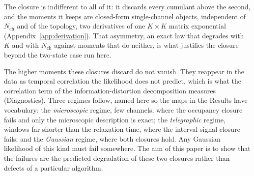 The closure is indifferent to all of it: it discards every cumulant above the second, and the
moments it keeps are closed-form single-channel objects, independent of $N_{\mathrm{ch}}$ and of
the topology, two derivatives of one $K\times K$ matrix exponential
(Appendix~\ref{app:derivation}). That asymmetry, an exact law that degrades with $K$ and with
$N_{\mathrm{ch}}$ against moments that do neither, is what justifies the closure beyond the
two-state case run here.

The higher moments these closures discard do not vanish. They reappear in the data as temporal
correlation the likelihood does not predict, which is what the correlation term of the
information-distortion decomposition measures (Diagnostics). Three regimes follow, named here so
the maps in the Results have vocabulary: the \emph{microscopic} regime, few channels, where the
occupancy closure fails and only the microscopic description is exact; the \emph{telegraphic}
regime, windows far shorter than the relaxation time, where the interval-signal closure fails;
and the \emph{Gaussian} regime, where both closures hold. Any Gaussian likelihood of this kind
must fail somewhere. The aim of this paper is to show that the failures are the predicted
degradation of these two closures rather than defects of a particular algorithm.


